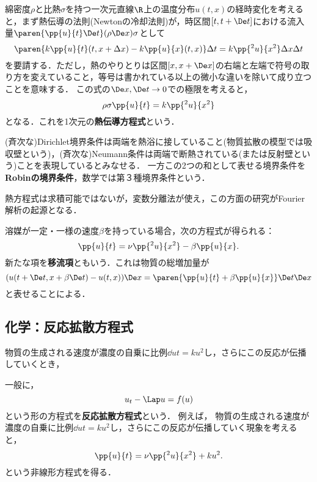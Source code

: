 \documentclass[uplatex,dvipdfmx]{jsreport}
\begin{document}
\begin{model}[熱伝導の模型]
    綿密度$\rho$と比熱$\sigma$を持つ一次元直線$\R$上の温度分布$u(t,x)$の経時変化を考えると，まず熱伝導の法則(Newtonの冷却法則)が，時区間$[t,t+\De t]$における流入量$\paren{\pp{u}{t}\De t}(\rho\De x)\sigma$として
    \[\paren{k\pp{u}{t}(t,x+\Delta x)-k\pp{u}{x}(t,x)}\Delta t=k\pp{^2u}{x^2}\Delta x\Delta t\]
    を要請する．ただし，熱のやりとりは区間$[x,x+\De x]$の右端と左端で符号の取り方を変えていること，等号は書かれている以上の微小な違いを除いて成り立つことを意味する．
    この式の$\De x,\De t\to0$での極限を考えると，
    \[\rho\sigma\pp{u}{t}=k\pp{^2u}{x^2}\]
    となる．これを1次元の\textbf{熱伝導方程式}という．
\end{model}
\begin{remarks}[境界条件について]
    (斉次な)Dirichlet境界条件は両端を熱浴に接していること(物質拡散の模型では吸収壁という)，(斉次な)Neumann条件は両端で断熱されている(または反射壁という)ことを表現しているとみなせる．
    一方この2つの和として表せる境界条件を\textbf{Robinの境界条件}，数学では第３種境界条件という．
\end{remarks}
\begin{history}
    熱方程式は求積可能ではないが，変数分離法が使え，この方面の研究がFourier解析の起源となる．
\end{history}

\begin{example}[移流拡散の模型]
    溶媒が一定・一様の速度$\beta$を持っている場合，次の方程式が得られる：
    \[\pp{u}{t}=\nu\pp{^2u}{x^2}-\beta\pp{u}{x}.\]
    新たな項を\textbf{移流項}ともいう．これは物質の総増加量が
    \[(u(t+\De t,x+\beta\De t)-u(t,x))\De x=\paren{\pp{u}{t}+\beta\pp{u}{x}}\De t\De x\]
    と表せることによる．
\end{example}

\subsection{化学：反応拡散方程式}

\begin{tcolorbox}[colframe=ForestGreen, colback=ForestGreen!10!white,breakable,colbacktitle=ForestGreen!40!white,coltitle=black,fonttitle=\bfseries\sffamily,
title=]
    物質の生成される速度が濃度の自乗に比例$\dd{u}{t}=ku^2$し，さらにこの反応が伝播していくとき，
\end{tcolorbox}

\begin{model}
    一般に，
    \[u_t-\Lap u=f(u)\]
    という形の方程式を\textbf{反応拡散方程式}という．
    例えば，
    物質の生成される速度が濃度の自乗に比例$\dd{u}{t}=ku^2$し，さらにこの反応が伝播していく現象を考えると，
    \[\pp{u}{t}=\nu\pp{^2u}{x^2}+ku^2.\]
    という非線形方程式を得る．
\end{model}
\end{document}
